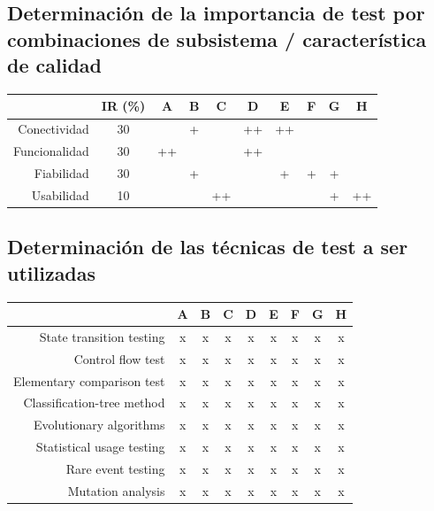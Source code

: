 \documentclass[
    11pt,
    spanish,
	a4paper
]{article}
\begin{document}
\subsection{Determinación de la importancia de test por combinaciones de subsistema / característica de calidad}
\label{sub:combinacion}

\begin{table}[H]
\centering
\begin{tabular}{r|ccccccccc}
    & IR (\%) & A & B & C & D & E & F & G & H \\ \hline
    Conectividad  & 30 &    & +  &    & ++ & ++ &    &    &    \\
    Funcionalidad & 30 & ++ &    &    & ++ &    &    &    &    \\
    Fiabilidad    & 30 &    & +  &    &    & +  & +  & +  &    \\
    Usabilidad    & 10 &    &    & ++ &    &    &    & +  & ++ \\
\end{tabular}
\end{table}


\subsection{Determinación de las técnicas de test a ser utilizadas}
\label{sub:tecnicas}

\begin{table}[H]
\centering
\begin{tabular}{r|cccccccc}
    & A & B & C & D & E & F & G & H\\ \hline
    State transition testing   & x & x & x & x & x & x & x & x \\
    Control flow test          & x & x & x & x & x & x & x & x \\
    Elementary comparison test & x & x & x & x & x & x & x & x \\
    Classification-tree method & x & x & x & x & x & x & x & x \\
    Evolutionary algorithms    & x & x & x & x & x & x & x & x \\
    Statistical usage testing  & x & x & x & x & x & x & x & x \\
    Rare event testing         & x & x & x & x & x & x & x & x \\
    Mutation analysis          & x & x & x & x & x & x & x & x \\

\end{tabular}
\end{table}
\end{document}
